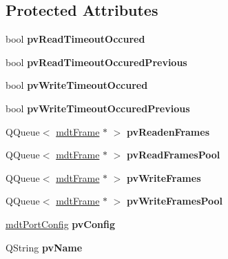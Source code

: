 \subsection*{Protected Attributes}
\begin{DoxyCompactItemize}
\item 
\hypertarget{classmdt_abstract_port_a9faa5966fcf4232b3d25034c0f67dd7c}{
bool {\bfseries pvReadTimeoutOccured}}
\label{classmdt_abstract_port_a9faa5966fcf4232b3d25034c0f67dd7c}

\item 
\hypertarget{classmdt_abstract_port_a2530e291d5ae4c1584595f9a5df7e9ff}{
bool {\bfseries pvReadTimeoutOccuredPrevious}}
\label{classmdt_abstract_port_a2530e291d5ae4c1584595f9a5df7e9ff}

\item 
\hypertarget{classmdt_abstract_port_ae5a003d280237700c8aa3cb6184e2d1b}{
bool {\bfseries pvWriteTimeoutOccured}}
\label{classmdt_abstract_port_ae5a003d280237700c8aa3cb6184e2d1b}

\item 
\hypertarget{classmdt_abstract_port_a8b65c0e26dc13147f02571ba74bef539}{
bool {\bfseries pvWriteTimeoutOccuredPrevious}}
\label{classmdt_abstract_port_a8b65c0e26dc13147f02571ba74bef539}

\item 
\hypertarget{classmdt_abstract_port_a412c3e4903bf7d90914cfeb273e82623}{
QQueue$<$ \hyperlink{classmdt_frame}{mdtFrame} $\ast$ $>$ {\bfseries pvReadenFrames}}
\label{classmdt_abstract_port_a412c3e4903bf7d90914cfeb273e82623}

\item 
\hypertarget{classmdt_abstract_port_a3d6bb9b420f64776d8fd077cf2b9b873}{
QQueue$<$ \hyperlink{classmdt_frame}{mdtFrame} $\ast$ $>$ {\bfseries pvReadFramesPool}}
\label{classmdt_abstract_port_a3d6bb9b420f64776d8fd077cf2b9b873}

\item 
\hypertarget{classmdt_abstract_port_a12cd5c1ba100b018539ed909a481d6dc}{
QQueue$<$ \hyperlink{classmdt_frame}{mdtFrame} $\ast$ $>$ {\bfseries pvWriteFrames}}
\label{classmdt_abstract_port_a12cd5c1ba100b018539ed909a481d6dc}

\item 
\hypertarget{classmdt_abstract_port_a67a8b1965f20a55ad115926aed0234b4}{
QQueue$<$ \hyperlink{classmdt_frame}{mdtFrame} $\ast$ $>$ {\bfseries pvWriteFramesPool}}
\label{classmdt_abstract_port_a67a8b1965f20a55ad115926aed0234b4}

\item 
\hypertarget{classmdt_abstract_port_a1d82fdf9ddd04e482cfa0854dc11ed22}{
\hyperlink{classmdt_port_config}{mdtPortConfig} {\bfseries pvConfig}}
\label{classmdt_abstract_port_a1d82fdf9ddd04e482cfa0854dc11ed22}

\item 
\hypertarget{classmdt_abstract_port_a133dec50898c780f00a1a4a843cf7543}{
QString {\bfseries pvName}}
\label{classmdt_abstract_port_a133dec50898c780f00a1a4a843cf7543}

\end{DoxyCompactItemize}


